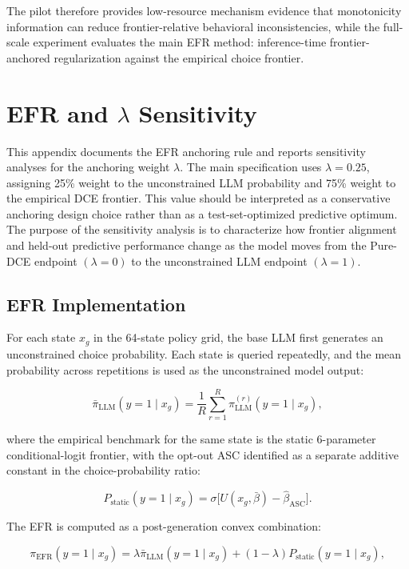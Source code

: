 \documentclass[11pt]{article}
\begin{document}
The pilot therefore provides low-resource mechanism evidence that monotonicity information can reduce frontier-relative behavioral inconsistencies, while the full-scale experiment evaluates the main EFR method: inference-time frontier-anchored regularization against the empirical choice frontier.


\section{EFR and \texorpdfstring{\(\lambda\)}{lambda} Sensitivity}
\label{app:lambda}

This appendix documents the EFR anchoring rule and reports sensitivity analyses for the anchoring weight \(\lambda\). The main specification uses \(\lambda=0.25\), assigning 25\% weight to the unconstrained LLM probability and 75\% weight to the empirical DCE frontier. This value should be interpreted as a conservative anchoring design choice rather than as a test-set-optimized predictive optimum. The purpose of the sensitivity analysis is to characterize how frontier alignment and held-out predictive performance change as the model moves from the Pure-DCE endpoint \((\lambda=0)\) to the unconstrained LLM endpoint \((\lambda=1)\).

\subsection{EFR Implementation}

For each state \(x_g\) in the 64-state policy grid, the base LLM first generates an unconstrained choice probability. Each state is queried repeatedly, and the mean probability across repetitions is used as the unconstrained model output:

\[
\bar{\pi}_{\mathrm{LLM}}(y=1 \mid x_g)
=
\frac{1}{R}
\sum_{r=1}^{R}
\pi_{\mathrm{LLM}}^{(r)}(y=1 \mid x_g),
\]

where the empirical benchmark for the same state is the static 6-parameter conditional-logit frontier, with the opt-out ASC identified as a separate additive constant in the choice-probability ratio:

\[
P_{\mathrm{static}}(y=1 \mid x_g)
=
\sigma\!\bigl[U(x_g, \bar\beta) - \hat\beta_{\mathrm{ASC}}\bigr].
\]

The EFR is computed as a post-generation convex combination:

\[
\pi_{\mathrm{EFR}}(y=1 \mid x_g)
=
\lambda \bar{\pi}_{\mathrm{LLM}}(y=1 \mid x_g)
+
(1-\lambda)P_{\mathrm{static}}(y=1 \mid x_g),
\]
\end{document}

